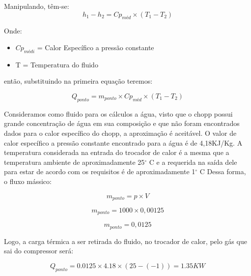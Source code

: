             Manipulando, têm-se:
            \begin{equation}
                h_1 - h_2 = Cp_{méd} \times (T_1 - T_2)
            \end{equation}

            Onde:
            \begin{itemize}
                \item $Cp_{médi}$ = Calor Específico a pressão constante
                \item T = Temperatura do fluido
            \end{itemize}
            então, substituindo na primeira equação teremos:
            
            \begin{equation}
                Q_{ponto} = m_{ponto} \times Cp_{méd} \times (T_1 - T_2)
            \end{equation}

            Consideramos como fluido para os cálculos a água, visto que o chopp possui
            grande concentração de água em sua composição e que não foram encontrados dados
            para o calor específico do chopp, a aproximação é aceitável. O valor de calor
            específico a pressão constante encontrado para a água é de 4,18KJ/Kg. A temperatura
            considerada na entrada do trocador de calor é a mesma que a temperatura ambiente
            de aproximadamente  25$^\circ$ C e a requerida na saída dele para estar de acordo com os
            requisitos é de aproximadamente 1$^\circ$ C Dessa forma, o fluxo mássico:

            \begin{equation}
                m_{ponto} = p \times V
            \end{equation}

            \begin{equation}
                m_{ponto} = 1000 \times 0,00125
            \end{equation}

            \begin{equation}
                m_{ponto} = 0,0125
            \end{equation}

            Logo, a carga térmica a ser retirada do fluido, no trocador de calor, pelo gás
            que sai do compressor será:

            \begin{equation}
                Q_{ponto} = 0.0125 \times 4.18 \times (25-(-1)) = 1.35 KW
            \end{equation}

